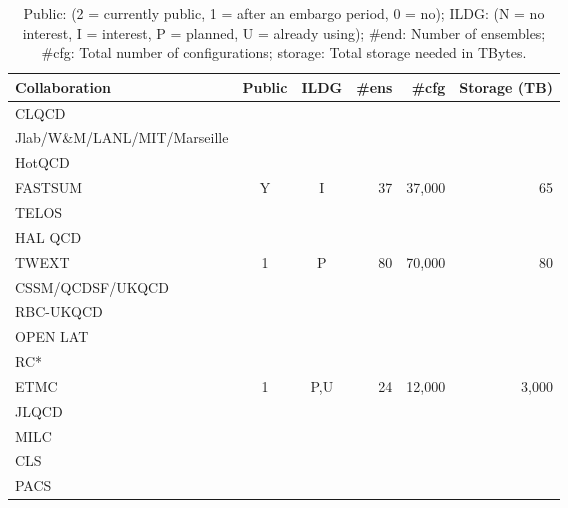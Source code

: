 \documentclass[a4paper,11pt]{article}
\begin{document}
\begin{table}[h]
  \caption{ Public: (2 = currently public, 1 = after an embargo period, 0 = no); ILDG: (N = no interest, I =
    interest, P = planned, U = already using); \#end: Number of
    ensembles; \#cfg: Total number of configurations; storage: Total
    storage needed in TBytes.
    \label{tab:summary}
  }
  \centering
  \begin{tabular}{lccrrr}\hline\hline
    Collaboration                & Public & ILDG & \#ens & \#cfg & Storage (TB) \\\hline
    CLQCD                        &        &      &       &       &              \\
    Jlab/W\&M/LANL/MIT/Marseille &        &      &       &       &              \\
    HotQCD                       &        &      &       &       &              \\
    FASTSUM                      &    Y   &  I   &  37   &37,000 & 65           \\
    TELOS                        &        &      &       &       &              \\
    HAL QCD                      &        &      &       &       &              \\
    TWEXT                        &    1   &  P   &  80   &70,000 &  80          \\
    CSSM/QCDSF/UKQCD             &        &      &       &       &              \\
    RBC-UKQCD                    &        &      &       &       &              \\
    OPEN LAT                     &        &      &       &       &              \\
    RC*                          &        &      &       &       &              \\
    ETMC                         &    1   &  P,U &  24   &12,000 & 3,000        \\
    JLQCD                        &        &      &       &       &              \\
    MILC                         &        &      &       &       &              \\
    CLS                          &        &      &       &       &              \\
    PACS                         &        &      &       &       &              \\\hline\hline
  \end{tabular}
\end{table}
\end{document}
